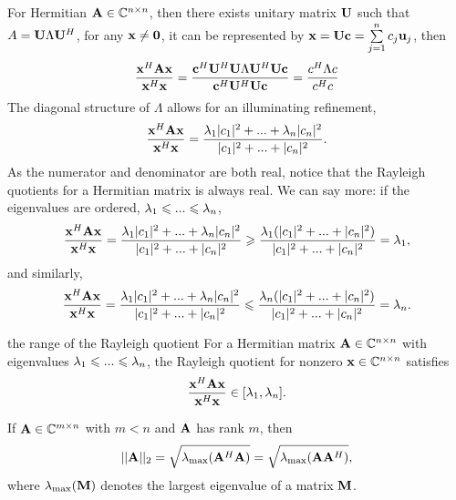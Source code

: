 \begin{remark}
    For Hermitian $\bold{A}\in \mathbb{C}^{n\times n}$, 
    then there exists unitary matrix $\bold{U}$ such that $A=\bold{U}\Lambda \bold{U}^H$, 
    for any $\bold{x}\neq \bold{0}$,  it can be represented by $\bold{x}=\bold{U}\bold{c}=\sum\limits_{j=1}^{n}c_j\bold{u}_j$, then 
    \begin{align*}
        \frac{\bold{x}^H\bold{A}\bold{x}}{\bold{x}^H\bold{x}}
        =\frac{\bold{c}^H\bold{U}^H\bold{U}\Lambda \bold{U}^H\bold{U}\bold{c}}{\bold{c}^H\bold{U}^H\bold{U}\bold{c}}
        =\frac{c^H\Lambda c}{c^Hc}
    \end{align*}
    The diagonal
    structure of $\Lambda$ allows for an illuminating refinement,
    \begin{align*}
        \frac{\bold{x}^H\bold{A}\bold{x}}{\bold{x}^H\bold{x}}=\frac{\lambda_1 |c_1|^2+...+\lambda_n |c_n|^2}{|c_1|^2+...+|c_n|^2}.
    \end{align*}
    As the numerator and denominator are both real, notice that the Rayleigh
    quotients for a Hermitian matrix is always real. We can say more: if the eigenvalues are ordered, $\lambda_1\leqslant ... \leqslant \lambda_n$,
    \begin{align*}
        \frac{\bold{x}^H\bold{A}\bold{x}}{\bold{x}^H\bold{x}}=\frac{\lambda_1 |c_1|^2+...+\lambda_n |c_n|^2}{|c_1|^2+...+|c_n|^2}\geqslant \frac{\lambda_1 (|c_1|^2+...+|c_n|^2)}{|c_1|^2+...+|c_n|^2}=\lambda_1,
    \end{align*}
    and similarly,
    \begin{align*}
        \frac{\bold{x}^H\bold{A}\bold{x}}{\bold{x}^H\bold{x}}=\frac{\lambda_1 |c_1|^2+...+\lambda_n |c_n|^2}{|c_1|^2+...+|c_n|^2}\leqslant \frac{\lambda_n (|c_1|^2+...+|c_n|^2)}{|c_1|^2+...+|c_n|^2}=\lambda_n.
    \end{align*}
\end{remark}

\begin{proposition}{}{the range of the Rayleigh quotient}
    For a Hermitian matrix $\bold{A}\in \mathbb{C}^{n\times n}$ with eigenvalues $\lambda_1\leqslant ...\leqslant \lambda_n$,
    the Rayleigh quotient for nonzero $\bold{x}\in \mathbb{C}^{n\times n}$ satisfies
    \begin{align*}
        \frac{\bold{x}^H\bold{A}\bold{x}}{\bold{x}^H\bold{x}}\in [\lambda_1,\lambda_n].
    \end{align*}
\end{proposition}

\begin{proposition}{}{}
    If $\bold{A}\in \mathbb{C}^{m\times n}$ with $m<n$ and $\bold{A}$ has rank $m$, then 
    \begin{align*}
        ||\bold{A}||_2=\sqrt{\lambda_{\max}(\bold{A}^H\bold{A})}=\sqrt{\lambda_{\max}(\bold{A}\bold{A}^H)},
    \end{align*}
    where $\lambda_{\max}(\bold{M})$ denotes the largest eigenvalue of a matrix $\bold{M}$.
\end{proposition}

